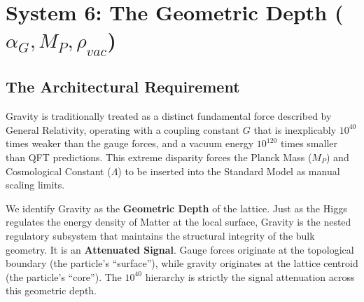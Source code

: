 \section{System 6: The Geometric Depth \texorpdfstring{($\alpha_G, M_P, \rho_{vac}$)}{(alphaG, MP, rhovac)}}
\label{sec:geometric_depth}





\subsection{The Architectural Requirement}
Gravity is traditionally treated as a distinct fundamental force described by General Relativity, operating with a coupling constant $G$ that is inexplicably $10^{40}$ times weaker than the gauge forces, and a vacuum energy $10^{120}$ times smaller than QFT predictions. This extreme disparity forces the Planck Mass ($M_P$) and Cosmological Constant ($\Lambda$) to be inserted into the Standard Model as manual scaling limits.

We identify Gravity as the \textbf{Geometric Depth} of the lattice. Just as the Higgs regulates the energy density of Matter at the local surface, Gravity is the nested regulatory subsystem that maintains the structural integrity of the bulk geometry. It is an \textbf{Attenuated Signal}. Gauge forces originate at the topological boundary (the particle's ``surface''), while gravity originates at the lattice centroid (the particle's ``core''). The $10^{40}$ hierarchy is strictly the signal attenuation across this geometric depth.

